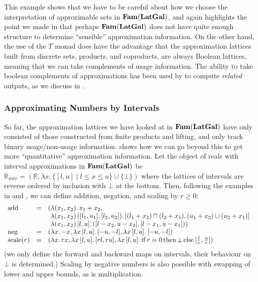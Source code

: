 This example shows that we have to be careful about how we choose the
interpretation of approximable sets in $\mathbf{Fam}(\mathbf{LatGal})$, and again
highlights the point we made in  that
perhaps $\mathbf{Fam}(\mathbf{LatGal})$ does not have quite enough structure to
determine ``sensible'' approximation information. On the other hand,
the use of the $T$ monad does have the advantage that the
approximation lattices built from discrete sets, products, and
coproducts, are always Boolean lattices, meaning that we can take
complements of usage information. The ability to take boolean
complements of approximations has been used by \citet{perera22} to
compute \emph{related} outputs, as we discuss in
.

\subsubsection{Approximating Numbers by Intervals}
\label{sec:interval-approx}

So far, the approximation lattices we have looked at in
$\mathbf{Fam}(\mathbf{LatGal})$ have only consisted of those constructed from finite
products and lifting, and only track binary usage/non-usage
information.  shows how we can go
beyond this to get more ``quantitative'' approximation
information. Let the object of reals with interval approximations in
$\mathbf{Fam}(\mathbf{LatGal})$ be
$\mathbb{R}_{\mathit{intv}} = (\mathbb{R}, \lambda x.\,\{[l,u] \mid l
\leq x \leq u\} \cup \{\bot\})$ where the lattices of intervals are
reverse ordered by inclusion with $\bot$ at the bottom. Then,
following the examples in  and
, we can define addition, negation, and
scaling by $r \geq 0$:
\begin{displaymath}
  \begin{array}{lcl}
    \mathrm{add}&=&(\begin{array}[t]{@{}l}
      \lambda (x_1,x_2).\,x_1+x_2, \\
      \lambda (x_1,x_2)\,([l_1,u_1],[l_2,u_2]).\,[(l_1+x_2) \sqcap (l_2+x_1),(u_1+x_2) \sqcup (u_2+x_1)] \\
      \lambda (x_1,x_2)\,[l,u].\,([l-x_2,u-x_2],[l-x_1,u-x_1]))
    \end{array}\\
    \mathrm{neg}&=&(\lambda x.\,{-}x, \lambda x\,[l,u].\,[-u,-l], \lambda x\,[l,u].\,[-u,-l]) \\
    \mathrm{scale}(r)&=&(\lambda x.\,rx, \lambda x\,[l,u].\,[rl,ru], \lambda x\,[l,u].\,\mathrm{if}\,r=0\,\mathrm{then}\,\bot\,\mathrm{else}\,[\frac{l}{r},\frac{u}{r}])
  \end{array}
\end{displaymath}
(we only define the forward and backward maps on intervals, their
behaviour on $\bot$ is determined.)  Scaling by negative numbers is
also possible with swapping of lower and upper bounds, as is
multiplication.

